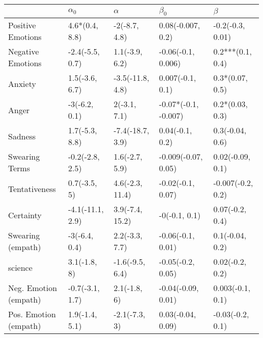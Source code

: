 \begin{tabular}{lllll}
\toprule
{} &        $\alpha_0$ &          $\alpha$ &             $\beta_0$ &            $\beta$ \\
\midrule
Positive Emotions     &    4.6*(0.4, 8.8) &     -2(-8.7, 4.8) &     0.08(-0.007, 0.2) &   -0.2(-0.3, 0.01) \\
Negative Emotions     &   -2.4(-5.5, 0.7) &    1.1(-3.9, 6.2) &    -0.06(-0.1, 0.006) &   0.2***(0.1, 0.4) \\
Anxiety               &    1.5(-3.6, 6.7) &  -3.5(-11.8, 4.8) &      0.007(-0.1, 0.1) &    0.3*(0.07, 0.5) \\
Anger                 &     -3(-6.2, 0.1) &      2(-3.1, 7.1) &  -0.07*(-0.1, -0.007) &    0.2*(0.03, 0.3) \\
Sadness               &    1.7(-5.3, 8.8) &  -7.4(-18.7, 3.9) &       0.04(-0.1, 0.2) &    0.3(-0.04, 0.6) \\
Swearing Terms        &   -0.2(-2.8, 2.5) &    1.6(-2.7, 5.9) &   -0.009(-0.07, 0.05) &   0.02(-0.09, 0.1) \\
Tentativeness         &      0.7(-3.5, 5) &   4.6(-2.3, 11.4) &     -0.02(-0.1, 0.07) &  -0.007(-0.2, 0.2) \\
Certainty             &  -4.1(-11.1, 2.9) &   3.9(-7.4, 15.2) &         -0(-0.1, 0.1) &    0.07(-0.2, 0.4) \\
Swearing (empath)     &     -3(-6.4, 0.4) &    2.2(-3.3, 7.7) &     -0.06(-0.1, 0.01) &    0.1(-0.04, 0.2) \\
science               &      3.1(-1.8, 8) &   -1.6(-9.5, 6.4) &     -0.05(-0.2, 0.05) &    0.02(-0.2, 0.2) \\
Neg. Emotion (empath) &   -0.7(-3.1, 1.7) &      2.1(-1.8, 6) &    -0.04(-0.09, 0.01) &   0.003(-0.1, 0.1) \\
Pos. Emotion (empath) &    1.9(-1.4, 5.1) &     -2.1(-7.3, 3) &     0.03(-0.04, 0.09) &   -0.03(-0.2, 0.1) \\
\bottomrule
\end{tabular}
